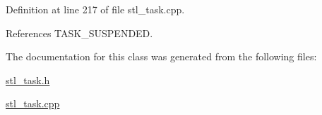 Definition at line 217 of file stl\-\_\-task.\-cpp.



References T\-A\-S\-K\-\_\-\-S\-U\-S\-P\-E\-N\-D\-E\-D.



The documentation for this class was generated from the following files\-:\begin{DoxyCompactItemize}
\item 
\hyperlink{stl__task_8h}{stl\-\_\-task.\-h}\item 
\hyperlink{stl__task_8cpp}{stl\-\_\-task.\-cpp}\end{DoxyCompactItemize}
